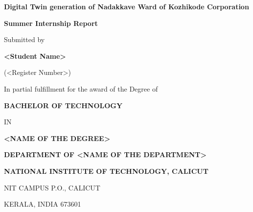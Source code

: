 \begin{titlepage}
    \centering
    \vspace*{1cm}
    
    {\Huge \textbf{Digital Twin generation of Nadakkave Ward of Kozhikode Corporation}\par}
    
    \vspace{1.5cm}
    {\Large \textbf{Summer Internship Report}\par}
    
    \vspace{1.5cm}
    Submitted by\par
    \vspace{0.5cm}
    {\Large \textbf{<Student Name>}\par}
    {\large (<Register Number>)\par}
    
    \vspace{1.5cm}
    In partial fulfillment for the award of the Degree of\par
    \vspace{0.5cm}
    {\Large \textbf{BACHELOR OF TECHNOLOGY}\par}
    \vspace{0.5cm}
    IN\par
    \vspace{0.5cm}
    {\Large \textbf{<NAME OF THE DEGREE>}\par}
    
    \vfill
    
    
    {\Large \textbf{DEPARTMENT OF <NAME OF THE DEPARTMENT>}\par}
    {\Large \textbf{NATIONAL INSTITUTE OF TECHNOLOGY, CALICUT}\par}
    {\large NIT CAMPUS P.O., CALICUT\par}
    {\large KERALA, INDIA 673601\par}
\end{titlepage}
